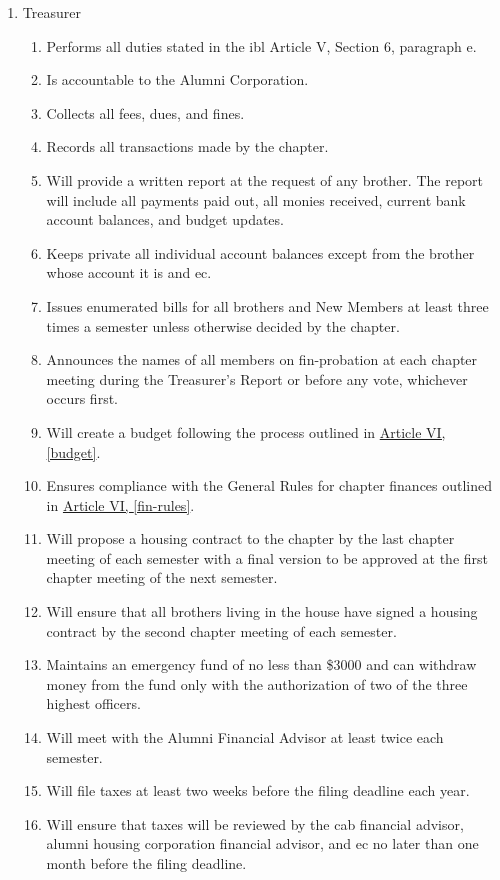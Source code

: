 \begin{enumerate}
		\item Treasurer \label{treasurer-duties}
			\begin{enumerate}
				\item Performs all duties stated in the \gls{ibl} Article V, Section 6, paragraph e.
				\item Is accountable to the Alumni Corporation.
				\item Collects all fees, dues, and fines.
				\item Records all transactions made by the chapter.
				\item Will provide a written report at the request of any brother. The report will include all payments paid out, all monies received, current bank account balances, and budget updates.
				\item Keeps private all individual account balances except from the brother whose account it is and \gls{ec}.
				\item Issues enumerated bills for all brothers and New Members at least three times a semester unless otherwise decided by the chapter.
				\item Announces the names of all members on \gls{fin-probation} at each chapter meeting during the Treasurer's Report or before any vote, whichever occurs first.
				\item Will create a budget following the process outlined in \hyperref[budget]{Article VI, \autoref*{budget}}.
				\item Ensures compliance with the General Rules for chapter finances outlined in \hyperref[fin-rules]{Article VI, \autoref*{fin-rules}}.
				\item Will propose a housing contract to the chapter by the last chapter meeting of each semester with a final version to be approved at the first chapter meeting of the next semester.
				\item Will ensure that all brothers living in the house have signed a housing contract by the second chapter meeting of each semester.\label{housing-contract}
				\item Maintains an emergency fund of no less than \$3000 and can withdraw money from the fund only with the authorization of two of the three highest officers. %
				\item Will meet with the Alumni Financial Advisor at least twice each semester.
				\item Will file taxes at least two weeks before the filing deadline each year.
				\item Will ensure that taxes will be reviewed by the \gls{cab} financial advisor, alumni housing corporation financial advisor, and \gls{ec} no later than one month before the filing deadline.

\end{enumerate}
\end{enumerate}
